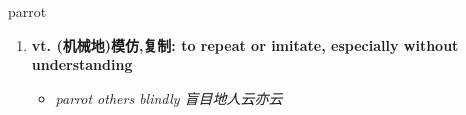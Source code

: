 
\begin{frame}
{\huge parrot}
\begin{center}
\begin{enumerate}\Large
  \item \textbf{vt. (机械地)模仿,复制: to repeat or imitate, especially without understanding}
  \begin{itemize}
    \item \em{\Large{parrot others blindly 盲目地人云亦云}}
  \end{itemize}
\end{enumerate}
\end{center}
\end{frame}
